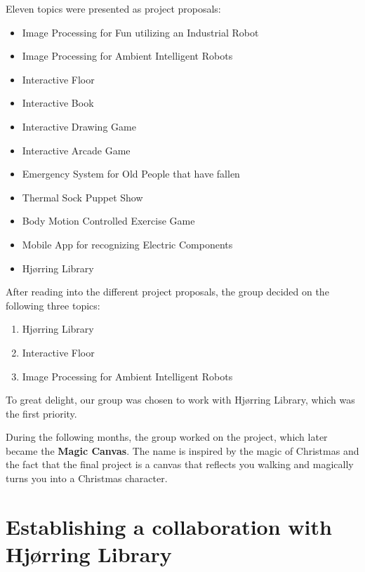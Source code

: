 Eleven topics were presented as project proposals:

\begin{itemize}
\item Image Processing for Fun utilizing an Industrial Robot
\item Image Processing for Ambient Intelligent Robots
\item Interactive Floor
\item Interactive Book
\item Interactive Drawing Game
\item Interactive Arcade Game
\item Emergency System for Old People that have fallen
\item Thermal Sock Puppet Show
\item Body Motion Controlled Exercise Game
\item Mobile App for recognizing Electric Components
\item Hj{\o}rring Library
\end{itemize}

After reading into the different project proposals, the group decided on the following three topics:

\begin{enumerate} 
\item Hj{\o}rring Library 
\item Interactive Floor 
\item Image Processing for Ambient Intelligent Robots 
\end{enumerate}

To great delight, our group was chosen to work with Hj{\o}rring Library, which was the first priority.

During the following months, the group worked on the project, which later became the \textbf{Magic Canvas}. The name is inspired by the magic of Christmas and the fact that the final project is a canvas that reflects you walking and magically turns you into a Christmas character.

\section{Establishing a collaboration with Hj{\o}rring Library}\label{sec:collab}


